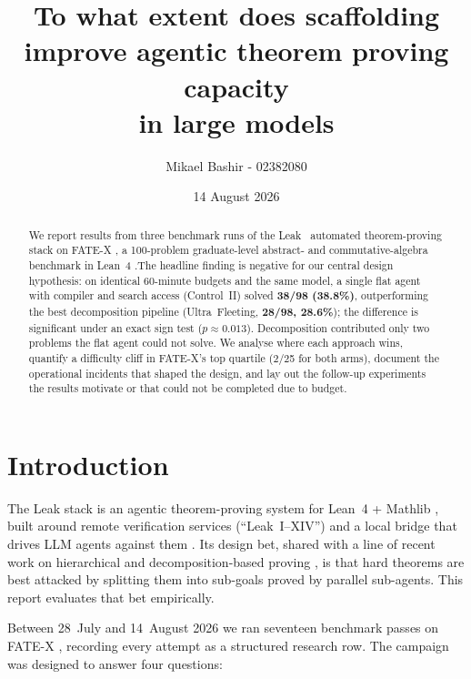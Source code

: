\documentclass[12pt, a4paper]{article}
\title{\textbf{To what extent does scaffolding improve agentic theorem
proving capacity\\ in large models}}
\author{Mikael Bashir - 02382080}
\date{14 August 2026}
\begin{document}
\maketitle

\begin{abstract}
\noindent
We report results from three benchmark runs of the Leak~\cite{leakabout} automated
theorem-proving stack on FATE-X \cite{fatex2025}, a 100-problem graduate-level
abstract- and commutative-algebra benchmark in Lean~4 \cite{demoura2021lean4}.The headline 
finding is negative for our central design hypothesis: on identical 60-minute budgets and the same model, a single
flat agent with compiler and search access (Control~II) solved
\textbf{38/98 (38.8\%)}, outperforming the best decomposition pipeline
(Ultra~Fleeting, \textbf{28/98, 28.6\%}); the difference is significant under an
exact sign test ($p \approx 0.013$). Decomposition contributed only two problems
the flat agent could not solve. We analyse where each approach wins, quantify a
difficulty cliff in FATE-X's top quartile (2/25 for both arms), document the
operational incidents that shaped the design, and lay out the follow-up
experiments the results motivate or that could not be completed due to budget.
\end{abstract}

\tableofcontents
\newpage

\section{Introduction}

The Leak stack is an agentic theorem-proving system for Lean~4 + Mathlib
\cite{demoura2021lean4,mathlib2020}, built around remote verification services
(``Leak~I--XIV'') and a local bridge that drives LLM agents against them
\cite{competemath,hfspaces}. Its design bet, shared with a line of recent work
on hierarchical and decomposition-based proving
\cite{lample2022hypertree,deepseekproverv2,decomposition_openreview,davis2025goedelspoetry},
is that hard theorems are best attacked by splitting them into sub-goals proved
by parallel sub-agents. This report evaluates that bet empirically.

Between 28~July and 14~August 2026 we ran seventeen benchmark passes on FATE-X
\cite{fatex2025,benchmarklist_fatex}, recording every attempt as a structured
research row. The campaign was designed to answer four questions:
\end{document}
